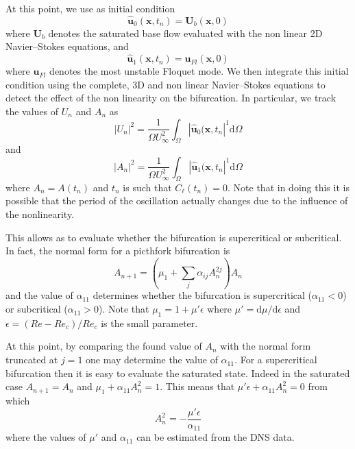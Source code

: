 \documentclass[onecolumn,notitlepage,superscriptaddress, amsmath,amssymb,longbibliographyaps,floatfix]{revtex4-1}
\begin{document}
At this point, we use as initial condition 
%
\begin{equation}
  \hat{\bm{u}}_0(\bm{x},t_n) = \bm{U}_b(\bm{x},0)
\end{equation}
%
where $\bm{U}_b$ denotes the saturated base flow evaluated with the non linear 2D Navier--Stokes equations, and
%
\begin{equation}
  \hat{\bm{u}}_1(\bm{x},t_n) = \bm{u}_{Fl}(\bm{x},0)
\end{equation}
%
where $\bm{u}_{Fl}$ denotes the most unstable Floquet mode.
We then integrate this initial condition using the complete, 3D and non linear Navier--Stokes equations to detect the effect of the non linearity on the bifurcation. In particular, we track the values of $U_n$ and $A_n$ as
%
\begin{equation}
  |U_n|^2 = \frac{1}{\Omega U_\infty^2} \int_{\Omega} | \hat{\bm{u}}_0(\bm{x},t_n |^1 \text{d}\Omega
\end{equation}
%
and
\begin{equation}
  |A_n|^2 = \frac{1}{\Omega U_\infty^2} \int_{\Omega} | \hat{\bm{u}}_1(\bm{x},t_n |^1 \text{d}\Omega
\end{equation}
%
where $A_n=A(t_n)$ and $t_n$ is such that $C_\ell(t_n) = 0$. Note that in doing this it is possible that the period of the oscillation actually changes due to the influence of the nonlinearity.

This allows as to evaluate whether the bifurcation is supercritical or subcritical. In fact, the normal form for a picthfork bifurcation is
%
\begin{equation}
  A_{n+1} = \left( \mu_1 + \sum_j \alpha_{ij}A_n^{2j} \right) A_n
\end{equation}
%
and the value of $\alpha_{11}$ determines whether the bifurcation is supercritical ($\alpha_{11}<0$) or subcritical ($\alpha_{11}>0$). Note that $\mu_1 = 1 + \mu'\epsilon$ where $\mu' = \text{d}\mu/\text{d}\epsilon$ and $\epsilon = (Re - Re_c)/Re_c$ is the small parameter.

At this point, by comparing the found value of $A_{n}$ with the normal form truncated at $j=1$ one may determine the value of $\alpha_{11}$. For a supercritical bifurcation then it is easy to evaluate the saturated state. Indeed in the saturated case $A_{n+1}=A_n$ and $\mu_1 + \alpha_{11}A_n^2 = 1$. This means that $\mu' \epsilon + \alpha_{11}A_n^2=0$ from which
%
\begin{equation}
  A_n^2 = - \frac{ \mu' \epsilon}{\alpha_{11}}
\end{equation}
%
where the values of $\mu'$ and $\alpha_{11}$ can be estimated from the DNS data.
\end{document}
